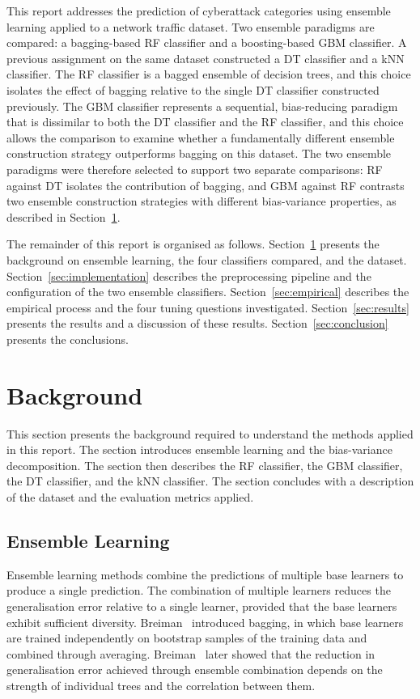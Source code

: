 \documentclass[conference,10pt]{IEEEtran}
\begin{document}
This report addresses the prediction of cyberattack categories using ensemble learning applied to a network traffic dataset. Two ensemble paradigms are compared: a bagging-based RF classifier and a boosting-based GBM classifier. A previous assignment on the same dataset constructed a DT classifier and a kNN classifier. The RF classifier is a bagged ensemble of decision trees, and this choice isolates the effect of bagging relative to the single DT classifier constructed previously. The GBM classifier represents a sequential, bias-reducing paradigm that is dissimilar to both the DT classifier and the RF classifier, and this choice allows the comparison to examine whether a fundamentally different ensemble construction strategy outperforms bagging on this dataset. The two ensemble paradigms were therefore selected to support two separate comparisons: RF against DT isolates the contribution of bagging, and GBM against RF contrasts two ensemble construction strategies with different bias-variance properties, as described in Section~\ref{sec:background}.

The remainder of this report is organised as follows. Section~\ref{sec:background} presents the background on ensemble learning, the four classifiers compared, and the dataset. Section~\ref{sec:implementation} describes the preprocessing pipeline and the configuration of the two ensemble classifiers. Section~\ref{sec:empirical} describes the empirical process and the four tuning questions investigated. Section~\ref{sec:results} presents the results and a discussion of these results. Section~\ref{sec:conclusion} presents the conclusions.

\section{Background}
\label{sec:background}
This section presents the background required to understand the methods applied in this report. The section introduces ensemble learning and the bias-variance decomposition. The section then describes the RF classifier, the GBM classifier, the DT classifier, and the kNN classifier. The section concludes with a description of the dataset and the evaluation metrics applied.

\subsection{Ensemble Learning}
Ensemble learning methods combine the predictions of multiple base learners to produce a single prediction. The combination of multiple learners reduces the generalisation error relative to a single learner, provided that the base learners exhibit sufficient diversity. Breiman~\cite{breiman1996bagging} introduced bagging, in which base learners are trained independently on bootstrap samples of the training data and combined through averaging. Breiman~\cite{breiman2001randomforest} later showed that the reduction in generalisation error achieved through ensemble combination depends on the strength of individual trees and the correlation between them.
\end{document}
